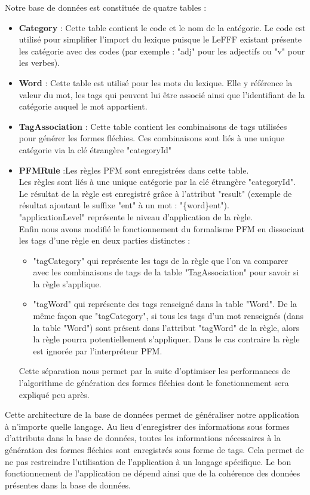 \documentclass[12pt,a4paper]{article}
\begin{document}
    Notre base de données est constituée de quatre tables :
    \begin{itemize}
        \item \textbf{Category} : Cette table contient le code et le nom de la catégorie.
        Le code est utilisé pour simplifier l'import du lexique puisque le LeFFF existant présente les catégorie avec des codes (par exemple : "adj" pour les adjectifs ou "v" pour les verbes).
        \item \textbf{Word} : Cette table est utilisé pour les mots du lexique. Elle y référence la valeur du mot, les tags qui peuvent lui être associé ainsi que l'identifiant de la catégorie auquel le mot appartient.
        \item \textbf{TagAssociation} : Cette table contient les combinaisons de tags utilisées pour générer les formes fléchies. Ces combinaisons sont liés à une unique catégorie via la clé étrangère "categoryId"
        \item \textbf{PFMRule} :Les règles PFM sont enregistrées dans cette table. \\
        Les règles sont liés à une unique catégorie par la clé étrangère "categoryId". \\
        Le résultat de la règle est enregistré grâce à l'attribut "result" (exemple de résultat ajoutant le suffixe "ent" à un mot : "\{word\}ent"). \\
        "applicationLevel" représente le niveau d'application de la règle. \\
        Enfin nous avons modifié le fonctionnement du formalisme PFM en dissociant les tags d'une règle en deux parties distinctes :
        \begin{itemize}
            \item "tagCategory" qui représente les tags de la règle que l'on va comparer avec les combinaisons de tags de la table "TagAssociation" pour savoir si la règle s'applique.

            \item "tagWord" qui représente des tags renseigné dans la table "Word". De la même façon que "tagCategory", si tous les tags d'un mot renseignés (dans la table "Word") sont présent dans l'attribut "tagWord" de la règle, alors la règle pourra potentiellement s'appliquer. Dans le cas contraire la règle est ignorée par l'interpréteur PFM.
        \end{itemize}
        Cette séparation nous permet par la suite d'optimiser les performances de l'algorithme de génération des formes fléchies dont le fonctionnement sera expliqué peu après.

    \end{itemize}
    \smallbreak
    Cette architecture de la base de données permet de généraliser notre application à n'importe quelle langage.
    Au lieu d'enregistrer des informations sous formes d'attributs dans la base de données, toutes les informations nécessaires à la génération des formes fléchies sont enregistrés sous forme de tags. Cela permet de ne pas restreindre l'utilisation de l'application à un langage spécifique.
    Le bon fonctionnement de l'application ne dépend ainsi que de la cohérence des données présentes dans la base de données.
\end{document}
